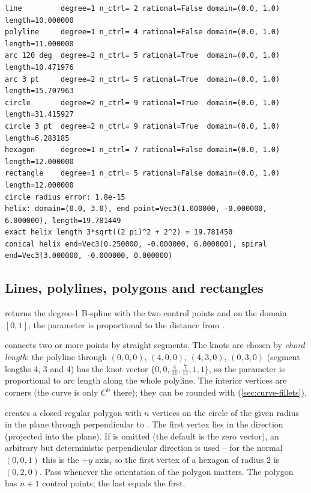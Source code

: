 \begin{lstlisting}[style=text]
line         degree=1 n_ctrl= 2 rational=False domain=(0.0, 1.0) length=10.000000
polyline     degree=1 n_ctrl= 4 rational=False domain=(0.0, 1.0) length=11.000000
arc 120 deg  degree=2 n_ctrl= 5 rational=True  domain=(0.0, 1.0) length=10.471976
arc 3 pt     degree=2 n_ctrl= 5 rational=True  domain=(0.0, 1.0) length=15.707963
circle       degree=2 n_ctrl= 9 rational=True  domain=(0.0, 1.0) length=31.415927
circle 3 pt  degree=2 n_ctrl= 9 rational=True  domain=(0.0, 1.0) length=6.283185
hexagon      degree=1 n_ctrl= 7 rational=False domain=(0.0, 1.0) length=12.000000
rectangle    degree=1 n_ctrl= 5 rational=False domain=(0.0, 1.0) length=12.000000
circle radius error: 1.8e-15
helix: domain=(0.0, 3.0), end point=Vec3(1.000000, -0.000000, 6.000000), length=19.781449
exact helix length 3*sqrt((2 pi)^2 + 2^2) = 19.781450
conical helix end=Vec3(0.250000, -0.000000, 6.000000), spiral end=Vec3(3.000000, -0.000000, 0.000000)
\end{lstlisting}

\subsection{Lines, polylines, polygons and rectangles}

 returns the degree-1 B-spline with the two control points  and
 on the domain $[0,1]$; the parameter is proportional to the distance from .

 connects two or more points by straight segments. The knots are
chosen by \emph{chord length}: the polyline through $(0,0,0)$, $(4,0,0)$, $(4,3,0)$, $(0,3,0)$
(segment lengths 4, 3 and 4) has the knot vector $\{0, 0, \tfrac{4}{11}, \tfrac{7}{11}, 1,
1\}$, so the parameter is proportional to arc length along the whole polyline. The interior
vertices are corners (the curve is only $C^0$ there); they can be rounded with
 (\cref{sec:curve-fillets}).

 creates a closed regular polygon with
$n$ vertices on the circle of the given radius in the plane through  perpendicular
to . The first vertex lies in the direction  (projected into the
plane). If  is omitted (the default is the zero vector), an arbitrary but
deterministic perpendicular direction is used -- for the normal $(0,0,1)$ this is the $+y$
axis, so the first vertex of a hexagon of radius 2 is $(0,2,0)$. Pass  whenever
the orientation of the polygon matters. The polygon has $n+1$ control points; the last equals
the first.

